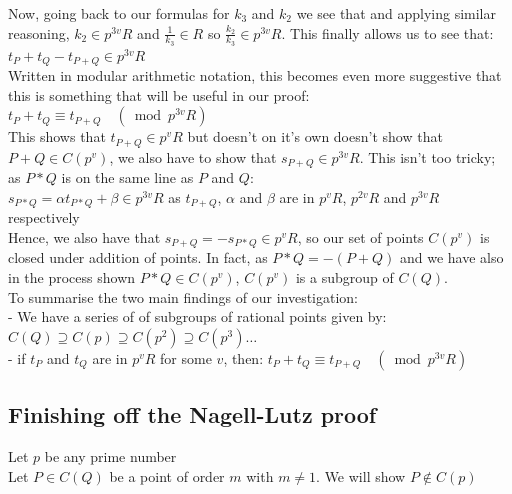 \documentclass{article}
\begin{document}
Now, going back to our formulas for $k_3$ and $k_2$ we see that and applying similar reasoning, $k_2 \in p^{3v}R$ and $\frac{1}{k_3} \in R$ so $\frac{k_2}{k_3} \in p^{3v}R$. This finally allows us to see that:\\

$t_P + t_Q - t_{P+Q} \in p^{3v}R$ \\

Written in modular arithmetic notation, this becomes even more suggestive that this is something that will be useful in our proof: \\

$t_P + t_Q  \equiv t_{P+Q} \quad (\bmod{p^{3v}R})$ \\

This shows that $t_{P+Q} \in p^{v}R$ but doesn't on it's own doesn't show that $P + Q \in C(p^v)$, we also have to show that $s_{P + Q} \in p^{3v}R$. This isn't too tricky; as $P*Q$ is on the same line as $P$ and $Q$:\\

$s_{P*Q} = \alpha t_{P*Q} + \beta \in p^{3v}R$ \quad as $t_{P+Q}$, $\alpha$ and $\beta$ are in $p^v R$, $p^{2v} R$ and $p^{3v} R$ respectively\\

Hence, we also have that $s_{P+Q} = -s_{P*Q} \in p^v R$, so our set of points $C(p^v)$ is closed under addition of points. In fact, as $P*Q = - (P+Q)$ and we have also in the process shown $P*Q \in C(p^v)$, $C(p^v)$ is a subgroup of $C(Q)$. \\

To summarise the two main findings of our investigation:\\

- We have a series of of subgroups of rational points given by: $C(Q) \supseteq C(p) \supseteq C(p^2) \supseteq C(p^3) \dots$\\

- if $t_P$ and $t_Q$ are in $p^v R$ for some $v$, then: $t_P + t_Q  \equiv t_{P+Q} \quad (\bmod{p^{3v}R})$

\subsection{Finishing off the Nagell-Lutz proof}

Let $p$ be any prime number\\

Let $P \in C(Q)$ be a point of order $m$ with $m \neq 1$. We will show $P \notin C(p)$ \\
\end{document}
